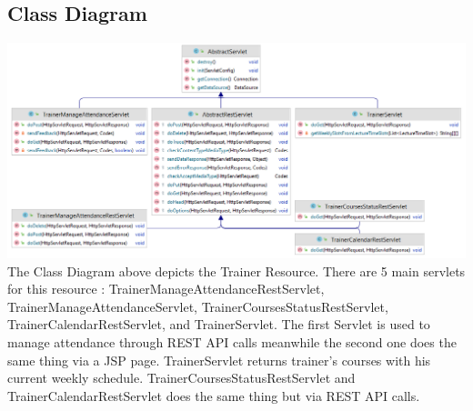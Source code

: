 \subsection{Class Diagram}



\includegraphics[width=\columnwidth]{resources/ClassDiagram_trainerServlets.png}
The Class Diagram above depicts the Trainer Resource. There are 5 main servlets for this resource : TrainerManageAttendanceRestServlet, TrainerManageAttendanceServlet, TrainerCoursesStatusRestServlet, TrainerCalendarRestServlet, and TrainerServlet. The first Servlet is used to manage attendance through REST API calls meanwhile the second one does the same thing via a JSP page. TrainerServlet returns trainer's courses with his current weekly schedule. TrainerCoursesStatusRestServlet and TrainerCalendarRestServlet does the same thing but via REST API calls.
